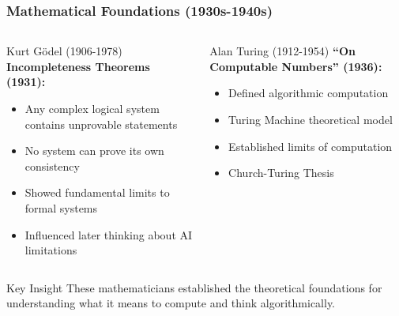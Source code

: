 \documentclass{beamer}
\begin{document}
\begin{frame}
    \frametitle{Mathematical Foundations (1930s-1940s)}
    \begin{columns}
        \begin{column}{0.48\textwidth}
            \begin{block}{Kurt Gödel (1906-1978)}
                \textbf{Incompleteness Theorems (1931):}
                \begin{itemize}
                    \item Any complex logical system contains unprovable statements
                    \item No system can prove its own consistency
                    \item Showed fundamental limits to formal systems
                    \item Influenced later thinking about AI limitations
                \end{itemize}
            \end{block}
        \end{column}
        \begin{column}{0.48\textwidth}
            \begin{block}{Alan Turing (1912-1954)}
                \textbf{``On Computable Numbers'' (1936):}
                \begin{itemize}
                    \item Defined algorithmic computation
                    \item Turing Machine theoretical model
                    \item Established limits of computation
                    \item Church-Turing Thesis
                \end{itemize}
            \end{block}
        \end{column}
    \end{columns}
    
    \begin{exampleblock}{Key Insight}
        These mathematicians established the theoretical foundations for understanding what it means to compute and think algorithmically.
    \end{exampleblock}
\end{frame}
\end{document}
